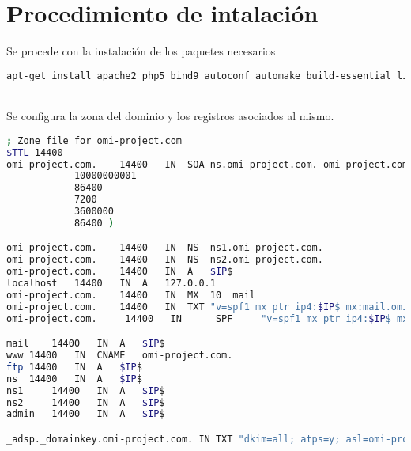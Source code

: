 
\section{Procedimiento de intalación}

Se procede con la instalación de los paquetes necesarios
\begin{lstlisting}[language=bash]
apt-get install apache2 php5 bind9 autoconf automake build-essential libreadline-dev libboost-regex-dev
\end{lstlisting}
\hfill\\

Se configura la zona del dominio y los registros asociados al mismo.
\begin{lstlisting}[language=bash]
; Zone file for omi-project.com
$TTL 14400
omi-project.com.	14400	IN	SOA	ns.omi-project.com. omi-project.com. (
			10000000001
			86400
			7200
			3600000
			86400 )

omi-project.com.	14400	IN	NS	ns1.omi-project.com.
omi-project.com.	14400 	IN	NS	ns2.omi-project.com.
omi-project.com.	14400	IN	A	$IP$
localhost	14400	IN	A	127.0.0.1
omi-project.com.	14400	IN	MX	10	mail
omi-project.com. 	14400	IN	TXT	"v=spf1 mx ptr ip4:$IP$ mx:mail.omi-project.com +all"
omi-project.com.     14400   IN      SPF     "v=spf1 mx ptr ip4:$IP$ mx:mail.omi-project.com +all"

mail	14400	IN	A	$IP$
www	14400	IN	CNAME	omi-project.com.
ftp	14400	IN	A	$IP$
ns	14400	IN	A	$IP$
ns1 	14400  	IN	A	$IP$
ns2 	14400	IN	A	$IP$
admin 	14400	IN	A	$IP$

_adsp._domainkey.omi-project.com. IN TXT "dkim=all; atps=y; asl=omi-project;"
\end{lstlisting}
\hfill\\

